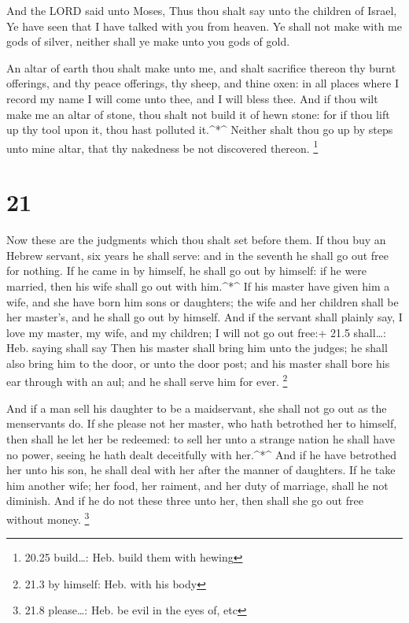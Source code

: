  And the LORD said unto Moses, Thus thou shalt say unto the
children of Israel, Ye have seen that I have talked with you from
heaven.  Ye shall not make with me gods of silver, neither
shall ye make unto you gods of gold.

 An altar of earth thou shalt make unto me, and shalt
sacrifice thereon thy burnt offerings, and thy peace offerings, thy
sheep, and thine oxen: in all places where I record my name I will come
unto thee, and I will bless thee.  And if thou wilt make me
an altar of stone, thou shalt not build it of hewn stone: for if thou
lift up thy tool upon it, thou hast polluted it.\^{}*\^{} 
Neither shalt thou go up by steps unto mine altar, that thy nakedness be
not discovered thereon. \footnote{20.25 build\ldots: Heb. build them
  with hewing}

\hypertarget{section-20}{%
\section{21}\label{section-20}}

 Now these are the judgments which thou shalt set before
them.  If thou buy an Hebrew servant, six years he shall
serve: and in the seventh he shall go out free for nothing. 
If he came in by himself, he shall go out by himself: if he were
married, then his wife shall go out with him.\^{}*\^{}  If
his master have given him a wife, and she have born him sons or
daughters; the wife and her children shall be her master's, and he shall
go out by himself.  And if the servant shall plainly say, I
love my master, my wife, and my children; I will not go out free:+ 21.5
shall\ldots: Heb. saying shall say  Then his master shall
bring him unto the judges; he shall also bring him to the door, or unto
the door post; and his master shall bore his ear through with an aul;
and he shall serve him for ever. \footnote{21.3 by himself: Heb. with
  his body}

 And if a man sell his daughter to be a maidservant, she
shall not go out as the menservants do.  If she please not
her master, who hath betrothed her to himself, then shall he let her be
redeemed: to sell her unto a strange nation he shall have no power,
seeing he hath dealt deceitfully with her.\^{}*\^{}  And if
he have betrothed her unto his son, he shall deal with her after the
manner of daughters.  If he take him another wife; her
food, her raiment, and her duty of marriage, shall he not diminish.
 And if he do not these three unto her, then shall she go
out free without money. \footnote{21.8 please\ldots: Heb. be evil in the
  eyes of, etc}


